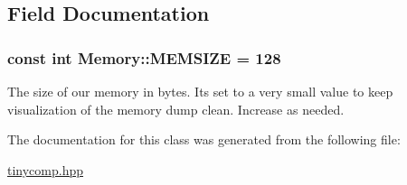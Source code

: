 \subsection{Field Documentation}
\subsubsection[{\texorpdfstring{M\+E\+M\+S\+I\+ZE}{MEMSIZE}}]{\setlength{\rightskip}{0pt plus 5cm}const int Memory\+::\+M\+E\+M\+S\+I\+ZE = 128\hspace{0.3cm}{\ttfamily [static]}}\hypertarget{class_memory_a1f45f0eb9259f5c73cdbb1190212315f}{}\label{class_memory_a1f45f0eb9259f5c73cdbb1190212315f}
The size of our memory in bytes. It\textquotesingle{}s set to a very small value to keep visualization of the memory dump clean. Increase as needed. 

The documentation for this class was generated from the following file\+:\begin{DoxyCompactItemize}
\item 
\hyperlink{tinycomp_8hpp}{tinycomp.\+hpp}\end{DoxyCompactItemize}
